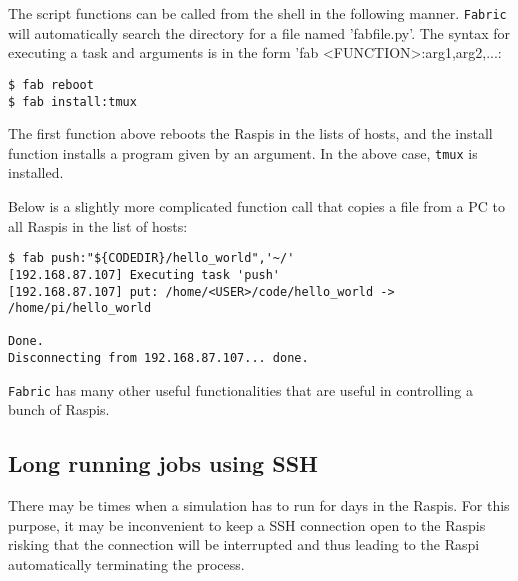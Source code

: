 The script functions can be called from the shell in the following
manner. \texttt{Fabric} will automatically search the directory for a file
named 'fabfile.py'. The syntax for executing a task and arguments is in the form
'fab <FUNCTION>:arg1,arg2,...:
\begin{lstlisting}[]
$ fab reboot
$ fab install:tmux
\end{lstlisting}
\FloatBarrier
\vspace{-5mm}
The first function above reboots the \ac{Raspi}s in the lists of hosts, and
the install function installs a program given by an argument. In the above case,
\texttt{tmux} is installed.

Below is a slightly more complicated function call that copies a file from
a \ac{PC} to all \ac{Raspi}s in the list of hosts:

\begin{lstlisting}[]
$ fab push:"${CODEDIR}/hello_world",'~/'
[192.168.87.107] Executing task 'push'
[192.168.87.107] put: /home/<USER>/code/hello_world -> /home/pi/hello_world

Done.
Disconnecting from 192.168.87.107... done.
\end{lstlisting}
\FloatBarrier
\vspace{-5mm}

\texttt{Fabric} has many other useful functionalities that are useful in
controlling a bunch of \ac{Raspi}s.





\subsection{Long running jobs using SSH}

There may be times when a simulation has to run for days in the \ac{Raspi}s.
For this purpose, it may be inconvenient to keep a \ac{SSH} connection
open to the \ac{Raspi}s risking that the connection will be interrupted and
thus leading to the \ac{Raspi} automatically terminating the process.


